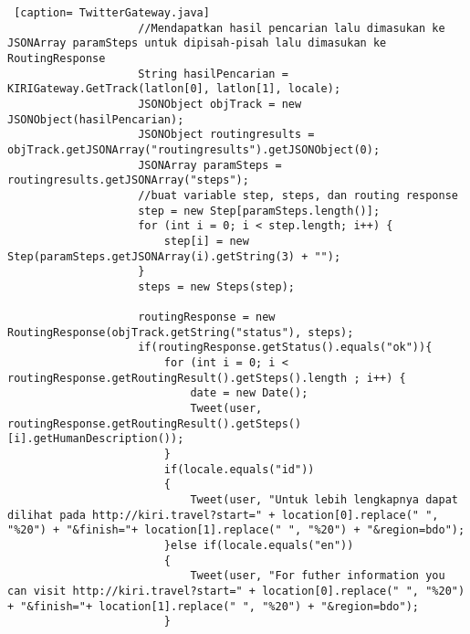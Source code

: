 \begin{lstlisting} [caption= TwitterGateway.java]
                    //Mendapatkan hasil pencarian lalu dimasukan ke JSONArray paramSteps untuk dipisah-pisah lalu dimasukan ke RoutingResponse
                    String hasilPencarian = KIRIGateway.GetTrack(latlon[0], latlon[1], locale);
                    JSONObject objTrack = new JSONObject(hasilPencarian);
                    JSONObject routingresults = objTrack.getJSONArray("routingresults").getJSONObject(0);
                    JSONArray paramSteps = routingresults.getJSONArray("steps");
                    //buat variable step, steps, dan routing response
                    step = new Step[paramSteps.length()];
                    for (int i = 0; i < step.length; i++) {
                        step[i] = new Step(paramSteps.getJSONArray(i).getString(3) + "");
                    }
                    steps = new Steps(step);

                    routingResponse = new RoutingResponse(objTrack.getString("status"), steps);
                    if(routingResponse.getStatus().equals("ok")){
                        for (int i = 0; i < routingResponse.getRoutingResult().getSteps().length ; i++) {
                            date = new Date();
                            Tweet(user, routingResponse.getRoutingResult().getSteps()[i].getHumanDescription());
                        }
                        if(locale.equals("id"))
                        {
                            Tweet(user, "Untuk lebih lengkapnya dapat dilihat pada http://kiri.travel?start=" + location[0].replace(" ", "%20") + "&finish="+ location[1].replace(" ", "%20") + "&region=bdo");
                        }else if(locale.equals("en"))
                        {
                            Tweet(user, "For futher information you can visit http://kiri.travel?start=" + location[0].replace(" ", "%20") + "&finish="+ location[1].replace(" ", "%20") + "&region=bdo");
                        }


\end{lstlisting}
